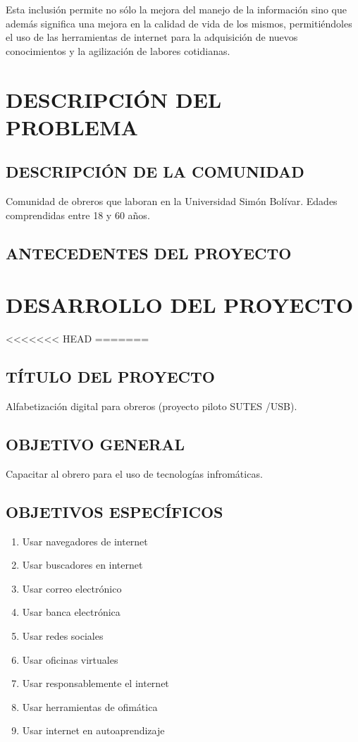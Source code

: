 \documentclass[letterpaper,12pt]{article}
\begin{document}
        Esta inclusión permite no sólo la mejora del manejo de la información sino que además significa una mejora en la calidad de vida de los mismos, permitiéndoles el uso de las herramientas de internet para la adquisición de nuevos conocimientos y la agilización de labores cotidianas.
	\pagebreak
	
	\section{DESCRIPCIÓN DEL PROBLEMA}
		\subsection{DESCRIPCIÓN DE LA COMUNIDAD}
			Comunidad de obreros que laboran en la Universidad Simón Bolívar. Edades
			comprendidas entre 18 y 60 años.
		\subsection{ANTECEDENTES DEL PROYECTO}
	\pagebreak
	
	\section{DESARROLLO DEL PROYECTO}
<<<<<<< HEAD
=======
        \subsection{TÍTULO DEL PROYECTO}
            Alfabetización digital para obreros (proyecto piloto SUTES /USB).
        \subsection{OBJETIVO GENERAL}
            Capacitar al obrero para el uso de tecnologías infromáticas.
            
        \subsection{OBJETIVOS ESPECÍFICOS}
            \begin{enumerate}
                \item Usar navegadores de internet
                \item Usar buscadores en internet
                \item Usar correo electrónico
                \item Usar banca electrónica
                \item Usar redes sociales
                \item Usar oficinas virtuales
                \item Usar responsablemente el internet
                \item Usar herramientas de ofimática
                \item Usar internet en autoaprendizaje
            \end{enumerate}
\end{document}
